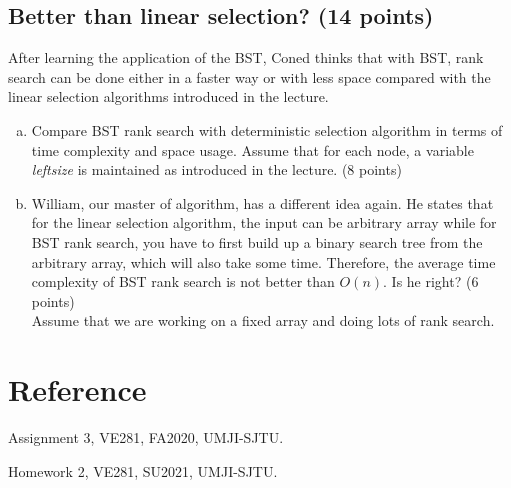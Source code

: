 \documentclass[11pt]{exam}
\begin{document}
\subsection{Better than linear selection? (14 points)}
After learning the application of the BST, Coned thinks that with BST, rank search can be done either in a faster way or with less space compared with the linear selection algorithms introduced in the lecture.
\begin{enumerate}[a)]
    \item Compare BST rank search with deterministic selection algorithm in terms of time complexity and space usage. Assume that for each node, a variable \textit{leftsize} is maintained as introduced in the lecture. (8 points)
    \begin{solution}
    \end{solution}
    \item William, our master of algorithm, has a different idea again. He states that for the linear selection algorithm, the input can be arbitrary array while for BST rank search, you have to first build up a binary search tree from the arbitrary array, which will also take some time. Therefore, the average time complexity of BST rank search is not better than $O(n)$. Is he right? (6 points)\\
    Assume that we are working on a fixed array and doing lots of rank search.
    \begin{solution}
    \end{solution}
\end{enumerate}

\section*{Reference}
Assignment 3, VE281, FA2020, UMJI-SJTU.

Homework 2, VE281, SU2021, UMJI-SJTU.
\end{document}
